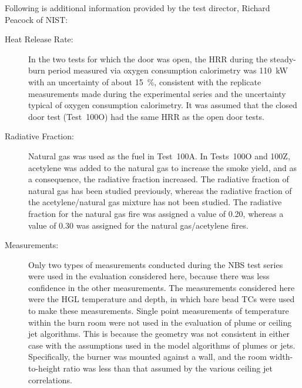Following is additional information provided by the test director, Richard Peacock of NIST:
\begin{description}
\item[Heat Release Rate:] In the two tests for which
the door was open, the HRR during the steady-burn period measured via oxygen consumption
calorimetry was 110~kW with an uncertainty of about 15~\%, consistent with the replicate
measurements made during the experimental series and the uncertainty typical of oxygen
consumption calorimetry. It was assumed that the closed door test (Test~100O) had the same HRR as the open
door tests.
\item[Radiative Fraction:] Natural gas was used as the fuel in
Test~100A. In Tests~100O and 100Z, acetylene was added to the natural gas to increase the
smoke yield, and as a consequence, the radiative fraction increased. The radiative fraction of
natural gas has been studied previously, whereas the radiative fraction of the acetylene/natural
gas mixture has not been studied. The radiative fraction for the natural gas fire was assigned a
value of 0.20, whereas a value of 0.30 was assigned for the natural gas/acetylene fires.
\item[Measurements:] Only two types of measurements conducted during the NBS test series were used in the
evaluation considered here, because there was less confidence in the other measurements.
The measurements considered here were the HGL temperature and depth, in which bare bead
TCs were used to make these measurements. Single point measurements of temperature within
the burn room were not used in the evaluation of plume or ceiling jet algorithms. This is because
the geometry was not consistent in either case with the assumptions used in the model algorithms
of plumes or jets. Specifically, the burner was mounted against a wall, and the room width-to-height
ratio was less than that assumed by the various ceiling jet correlations.
\end{description}


